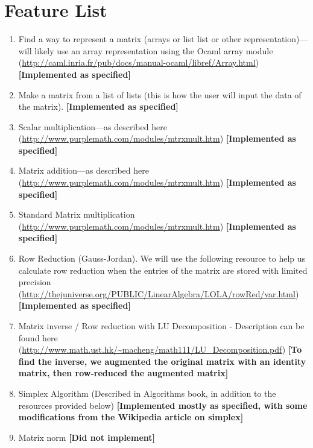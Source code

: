 \documentclass[letterpaper,11pt]{article}
\newcommand{\annot}[1]{\textbf{\color{BrickRed} [#1]}}
\begin{document}
\section{Feature List}
\begin{enumerate}

\item Find a way to represent a matrix (arrays or list list or other
representation)---will likely use an array representation using the Ocaml array
module (\url{http://caml.inria.fr/pub/docs/manual-ocaml/libref/Array.html})
{\annot{Implemented as specified}}

\item Make a matrix from a list of lists (this is how the user will input the
data of the matrix). {\annot{Implemented as specified}}

\item Scalar multiplication---as described here
(\url{http://www.purplemath.com/modules/mtrxmult.htm})
{\annot{Implemented as specified}}

\item Matrix addition---as described here
(\url{http://www.purplemath.com/modules/mtrxmult.htm})
{\annot{Implemented as specified}}

\item Standard Matrix multiplication
(\url{http://www.purplemath.com/modules/mtrxmult.htm}) 
{\annot{Implemented as specified}}

\item Row Reduction (Gauss-Jordan). We will use the following resource to help
us calculate row reduction when the entries of the matrix are stored with
limited precision
(\url{http://thejuniverse.org/PUBLIC/LinearAlgebra/LOLA/rowRed/var.html})
{\annot{Implemented as specified}}

\item Matrix inverse / Row reduction with LU Decomposition - Description can be
found here (\url{http://www.math.ust.hk/~macheng/math111/LU_Decomposition.pdf})
{\annot{To find the inverse, we augmented the original matrix with an identity
matrix, then row-reduced the augmented matrix}}

\item Simplex Algorithm (Described in Algorithms book, in addition to the
resources provided below)
{\annot{Implemented mostly as specified, with some modifications from the
Wikipedia article on simplex}}

\item Matrix norm 
{\annot{Did not implement}}


\end{enumerate}
\end{document}
